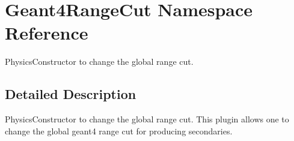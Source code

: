 \hypertarget{namespace_geant4_range_cut}{
\section{Geant4RangeCut Namespace Reference}
\label{namespace_geant4_range_cut}
}


PhysicsConstructor to change the global range cut.  


\subsection{Detailed Description}
PhysicsConstructor to change the global range cut. This plugin allows one to change the global geant4 range cut for producing secondaries. 